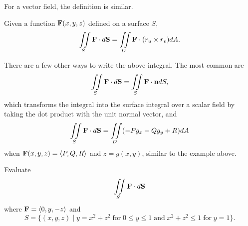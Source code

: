 For a vector field, the definition is similar.

\begin{definition}
    Given a function $\mathbf{F}(x, y, z)$ defined on a surface $S$,
    \[\iint\limits_{S}\mathbf{F} \cdot d\mathbf{S} = \iint\limits_{D}\mathbf{F} \cdot (r_{u} \times r_{v})dA.\]
\end{definition}

\begin{remark}
    There are a few other ways to write the above integral. The most common are
    \[\iint\limits_{S}\mathbf{F} \cdot d\mathbf{S} = \iint\limits_{S}\mathbf{F} \cdot \mathbf{n}dS,\]
    which transforms the integral into the surface integral over a scalar field by taking the dot product with the unit normal vector, and
    \[\iint\limits_{S}\mathbf{F} \cdot d\mathbf{S} = \iint\limits_{D}(-Pg_{x} - Qg_{y} + R)dA\]
    when $\mathbf{F}(x, y, z) = \left<P, Q, R\right>$ and $z = g(x, y)$, similar to the example above.
\end{remark}

\begin{problem}
    Evaluate
    \[\iint\limits_{S}\mathbf{F} \cdot d\mathbf{S}\]
    where $\mathbf{F} = \left<0, y, -z\right>$ and
    \[S = \{(x, y, z) \mid y = x^{2} + z^{2} \; \text{for} \; 0 \leq y \leq 1 \; \text{and} \; x^{2} + z^{2} \leq 1 \; \text{for} \; y = 1\}.\]
\end{problem}

